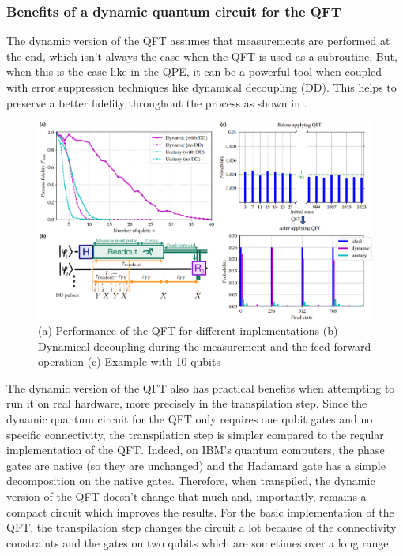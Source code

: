 
\subsubsection{Benefits of a dynamic quantum circuit for the QFT}
The dynamic version of the QFT assumes that measurements are performed at the end, which isn't always the case when the QFT is used as a subroutine. But, when this is the case like in the QPE, it can be a powerful tool when coupled with error suppression techniques like dynamical decoupling (DD). This helps to preserve a better fidelity throughout the process as shown in \cite{bäumer2024quantumfouriertransformusing}.

\begin{figure}[H]
    \centering
    \includegraphics*[scale=0.45]{images/results_dynamical_decoupling.png}
    \caption{(a) Performance of the QFT for different implementations (b) Dynamical decoupling during the measurement and the feed-forward operation (c) Example with 10 qubits}
    \label{dynamical_decoupling_results}
\end{figure}

The dynamic version of the QFT also has practical benefits when attempting to run it on real hardware, more precisely in the transpilation step. Since the dynamic quantum circuit for the QFT only requires one qubit gates and no specific connectivity, the transpilation step is simpler compared to the regular implementation of the QFT. Indeed, on IBM's quantum computers, the phase gates are native (so they are unchanged) and the Hadamard gate has a simple decomposition on the native gates. Therefore, when transpiled, the dynamic version of the QFT doesn't change that much and, importantly, remains a compact circuit which improves the results. For the basic implementation of the QFT, the transpilation step changes the circuit a lot because of the connectivity constraints and the gates on two qubits which are sometimes over a long range.

